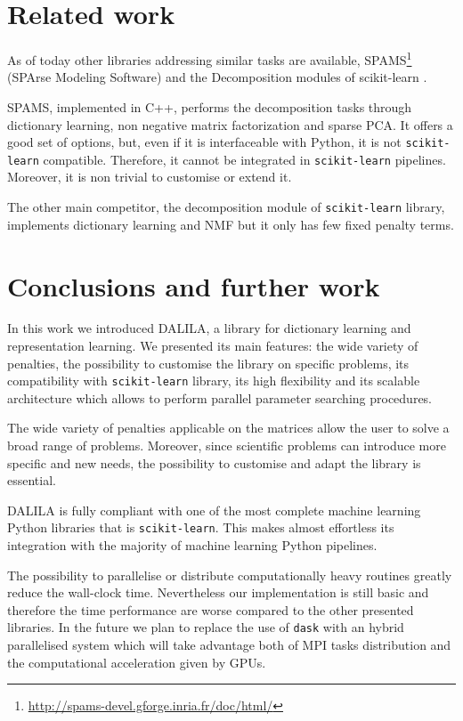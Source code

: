 \section{Related work}\label{related work}
As of today other libraries addressing similar tasks are available, {SPAMS}\footnote{\url{http://spams-devel.gforge.inria.fr/doc/html/}} (SPArse Modeling Software) \cite{Mairal2010} and the Decomposition modules of scikit-learn \cite{cichocki2009fast, lin2007}.

SPAMS, implemented in C++, performs the  decomposition tasks through dictionary learning, non negative matrix factorization and sparse PCA. It offers a good set of options, but, even if it is interfaceable with Python, it is not \texttt{scikit-learn} compatible. Therefore, it cannot be integrated in \texttt{scikit-learn} pipelines. Moreover, it is non trivial to customise or extend it.

The other main competitor, the decomposition module of \texttt{scikit-learn} library, implements dictionary learning and NMF but it only has few fixed penalty terms.

\section{Conclusions and further work}

In this work we introduced DALILA, a library for dictionary learning and representation learning. We presented its main features: the wide variety of penalties, the possibility to customise the library on specific problems, its compatibility with \texttt{scikit-learn} library, its high flexibility and its scalable architecture which allows to perform parallel parameter searching procedures.

The wide variety of penalties applicable on the matrices allow the user to solve a broad range of problems. Moreover, since scientific problems can introduce more specific and new needs, the possibility to customise and adapt the library is essential.

DALILA is fully compliant with one of the most complete machine learning Python libraries that is \texttt{scikit-learn}. This makes almost effortless its integration with the majority of machine learning Python pipelines.

The possibility to parallelise or distribute computationally heavy routines \cite{dask}  greatly reduce the wall-clock time. Nevertheless our implementation is still basic and therefore the time performance are worse compared to the other presented libraries. In the future we plan to replace the use of \texttt{dask} with an hybrid parallelised system which will take advantage both of MPI tasks distribution and the computational acceleration given by GPUs. 

